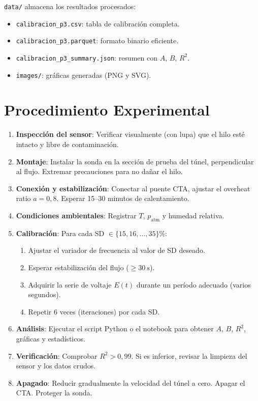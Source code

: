\documentclass[12pt,a4paper]{article}
\begin{document}
\texttt{data/} almacena los resultados procesados:
\begin{itemize}
	\item \texttt{calibracion\_p3.csv}: tabla de calibración completa.
	\item \texttt{calibracion\_p3.parquet}: formato binario eficiente.
	\item \texttt{calibracion\_p3\_summary.json}: resumen con $A$, $B$, $R^2$.
	\item \texttt{images/}: gráficas generadas (PNG y SVG).
\end{itemize}

\section{Procedimiento Experimental}
\label{sec:procedimiento}

\begin{enumerate}
	\item \textbf{Inspección del sensor}: Verificar visualmente (con lupa) que
	      el hilo esté intacto y libre de contaminación.
	\item \textbf{Montaje}: Instalar la sonda en la sección de prueba del
	      túnel, perpendicular al flujo.  Extremar precauciones para no dañar
	      el hilo.
	\item \textbf{Conexión y estabilización}: Conectar al puente CTA, ajustar
	      el overheat ratio $a = 0{,}8$.  Esperar 15--30 minutos de
	      calentamiento.
	\item \textbf{Condiciones ambientales}: Registrar $T$, $p_\mathrm{atm}$
	      y humedad relativa.
	\item \textbf{Calibración}: Para cada SD $\in \{15, 16, \ldots, 35\}\%$:
	      \begin{enumerate}
		      \item Ajustar el variador de frecuencia al valor de SD deseado.
		      \item Esperar estabilización del flujo ($\geq\SI{30}{\second}$).
		      \item Adquirir la serie de voltaje $E(t)$ durante un período
		            adecuado (varios segundos).
		      \item Repetir 6 veces (iteraciones) por cada SD.
	      \end{enumerate}
	\item \textbf{Análisis}: Ejecutar el script Python o el notebook para
	      obtener $A$, $B$, $R^2$, gráficas y estadísticos.
	\item \textbf{Verificación}: Comprobar $R^2 > 0{,}99$.  Si es inferior,
	      revisar la limpieza del sensor y los datos crudos.
	\item \textbf{Apagado}: Reducir gradualmente la velocidad del túnel a
	      cero.  Apagar el CTA.  Proteger la sonda.
\end{enumerate}
\end{document}
